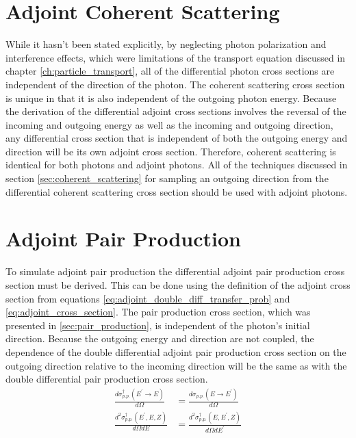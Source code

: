 \section{Adjoint Coherent Scattering}
While it hasn't been stated explicitly, by neglecting photon polarization and
interference effects, which were limitations of the transport equation discussed
in chapter \ref{ch:particle_transport}, all of the differential photon cross
sections are independent of the direction of the photon. The coherent scattering
cross section is unique in that it is also independent of the outgoing photon
energy. Because the derivation of the differential adjoint cross sections 
involves the reversal of the incoming and outgoing energy as well as the 
incoming and outgoing direction, any differential cross section that is 
independent of both the outgoing energy and direction will be its own adjoint
cross section. Therefore, coherent scattering is identical for both photons and
adjoint photons. All of the techniques discussed in section 
\ref{sec:coherent_scattering} for sampling an outgoing direction from the 
differential coherent scattering cross section should be used with adjoint
photons.

\section{Adjoint Pair Production}
To simulate adjoint pair production the differential adjoint pair production 
cross section must be derived. This can be done using the definition of the
adjoint cross section from equations \ref{eq:adjoint_double_diff_transfer_prob} 
and \ref{eq:adjoint_cross_section}. The pair production cross section, which
was presented in \ref{sec:pair_production}, is independent of the photon's 
initial direction. Because the outgoing energy and direction are not coupled,
the dependence of the double differential adjoint pair production cross section 
on the outgoing direction relative to the incoming direction will be the same
as with the double differential pair production cross section.
\begin{align}
  \frac{d\sigma_{p.p.}^{\dagger}(E^{'} \to E)}{d\Omega} & = 
  \frac{d\sigma_{p.p.}(E \to E^{'})}{d\Omega} \nonumber \\
  \frac{d^2\sigma_{p.p.}^{\dagger}(E^{'},E,Z)}{d\Omega dE} & = 
  \frac{d^2\sigma_{p.p.}^{\dagger}(E,E^{'},Z)}{d\Omega dE^{'}}
\end{align}


